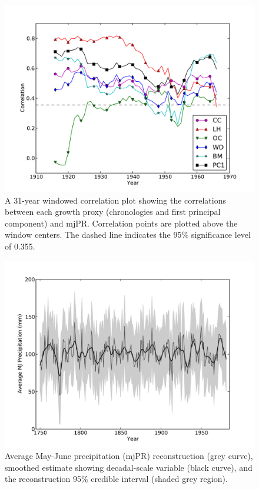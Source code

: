 \begin{figure}
\centering
\includegraphics[width=5in]{figures/precipRunningCorr.pdf}
\caption{A 31-year windowed correlation plot showing the correlations between each growth proxy (chronologies and first principal component) and mjPR. Correlation points are plotted above the window centers. The dashed line indicates the 95\% significance level of 0.355.}
\label{fig:precipRunningCorr}
\end{figure}

\begin{figure}
\centering
\includegraphics[width=5in]{figures/recon.pdf}
\caption{Average May-June precipitation (mjPR) reconstruction (grey curve), smoothed estimate showing decadal-scale variable (black curve), and the reconstruction 95\% credible interval (shaded grey region).}
\label{fig:precipRecon}
\end{figure}

